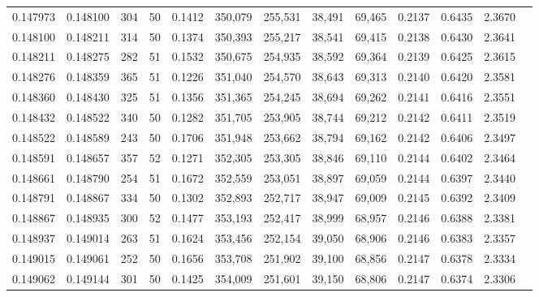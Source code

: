 \begin{tabular}{rrrrrrrrrrrrr}
0.147973 & 0.148100 &   304 &  50 &                                     0.1412 & 350,079 & 255,531 &  38,491 &  69,465 & 0.2137 & 0.6435 & 2.3670 \\
0.148100 & 0.148211 &   314 &  50 &                                     0.1374 & 350,393 & 255,217 &  38,541 &  69,415 & 0.2138 & 0.6430 & 2.3641 \\
0.148211 & 0.148275 &   282 &  51 &                                     0.1532 & 350,675 & 254,935 &  38,592 &  69,364 & 0.2139 & 0.6425 & 2.3615 \\
0.148276 & 0.148359 &   365 &  51 &                                     0.1226 & 351,040 & 254,570 &  38,643 &  69,313 & 0.2140 & 0.6420 & 2.3581 \\
0.148360 & 0.148430 &   325 &  51 &                                     0.1356 & 351,365 & 254,245 &  38,694 &  69,262 & 0.2141 & 0.6416 & 2.3551 \\
0.148432 & 0.148522 &   340 &  50 &                                     0.1282 & 351,705 & 253,905 &  38,744 &  69,212 & 0.2142 & 0.6411 & 2.3519 \\
0.148522 & 0.148589 &   243 &  50 &                                     0.1706 & 351,948 & 253,662 &  38,794 &  69,162 & 0.2142 & 0.6406 & 2.3497 \\
0.148591 & 0.148657 &   357 &  52 &                                     0.1271 & 352,305 & 253,305 &  38,846 &  69,110 & 0.2144 & 0.6402 & 2.3464 \\
0.148661 & 0.148790 &   254 &  51 &                                     0.1672 & 352,559 & 253,051 &  38,897 &  69,059 & 0.2144 & 0.6397 & 2.3440 \\
0.148791 & 0.148867 &   334 &  50 &                                     0.1302 & 352,893 & 252,717 &  38,947 &  69,009 & 0.2145 & 0.6392 & 2.3409 \\
0.148867 & 0.148935 &   300 &  52 &                                     0.1477 & 353,193 & 252,417 &  38,999 &  68,957 & 0.2146 & 0.6388 & 2.3381 \\
0.148937 & 0.149014 &   263 &  51 &                                     0.1624 & 353,456 & 252,154 &  39,050 &  68,906 & 0.2146 & 0.6383 & 2.3357 \\
0.149015 & 0.149061 &   252 &  50 &                                     0.1656 & 353,708 & 251,902 &  39,100 &  68,856 & 0.2147 & 0.6378 & 2.3334 \\
0.149062 & 0.149144 &   301 &  50 &                                     0.1425 & 354,009 & 251,601 &  39,150 &  68,806 & 0.2147 & 0.6374 & 2.3306 \\

\end{tabular}
